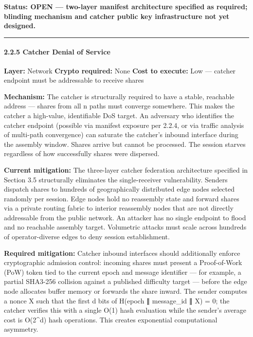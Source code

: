 \documentclass[
  11pt,
]{article}
\begin{document}
\textbf{Status: OPEN --- two-layer manifest architecture specified as
required; blinding mechanism and catcher public key infrastructure not
yet designed.}

\begin{center}\rule{0.5\linewidth}{0.5pt}\end{center}

\hypertarget{catcher-denial-of-service}{%
\paragraph{2.2.5 Catcher Denial of
Service}\label{catcher-denial-of-service}}

\textbf{Layer:} Network \textbf{Crypto required:} None \textbf{Cost to
execute:} Low --- catcher endpoint must be addressable to receive shares

\textbf{Mechanism:} The catcher is structurally required to have a
stable, reachable address --- shares from all n paths must converge
somewhere. This makes the catcher a high-value, identifiable DoS target.
An adversary who identifies the catcher endpoint (possible via manifest
exposure per 2.2.4, or via traffic analysis of multi-path convergence)
can saturate the catcher's inbound interface during the assembly window.
Shares arrive but cannot be processed. The session starves regardless of
how successfully shares were dispersed.

\textbf{Current mitigation:} The three-layer catcher federation
architecture specified in Section 3.5 structurally eliminates the
single-receiver vulnerability. Senders dispatch shares to hundreds of
geographically distributed edge nodes selected randomly per session.
Edge nodes hold no reassembly state and forward shares via a private
routing fabric to interior reassembly nodes that are not directly
addressable from the public network. An attacker has no single endpoint
to flood and no reachable assembly target. Volumetric attacks must scale
across hundreds of operator-diverse edges to deny session establishment.

\textbf{Required mitigation:} Catcher inbound interfaces should
additionally enforce cryptographic admission control: incoming shares
must present a Proof-of-Work (PoW) token tied to the current epoch and
message identifier --- for example, a partial SHA3-256 collision against
a published difficulty target --- before the edge node allocates buffer
memory or forwards the share inward. The sender computes a nonce X such
that the first d bits of H(epoch ∥ message\_id ∥ X) = 0; the catcher
verifies this with a single O(1) hash evaluation while the sender's
average cost is O(2\^{}d) hash operations. This creates exponential
computational asymmetry.
\end{document}

